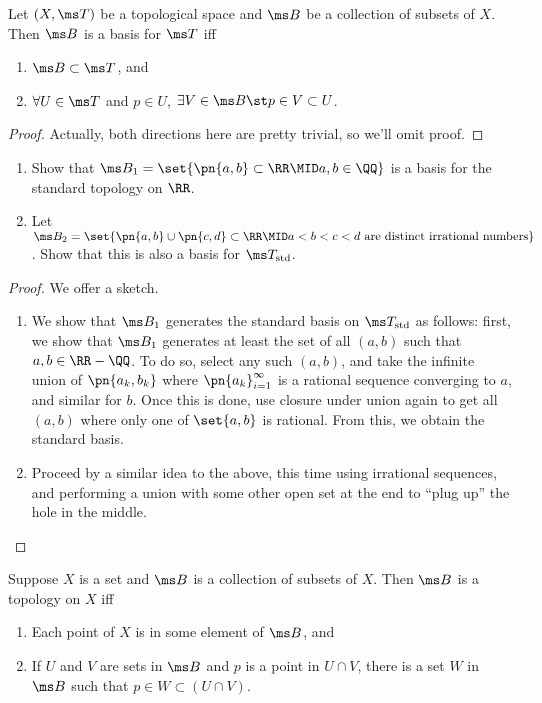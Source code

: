 \begin{problem}[4.1]
  Let $(X,\ms T)$ be a topological space and $\ms B$ be a collection of subsets
  of $X$. Then $\ms B$ is a basis for $\ms T$ iff
  \begin{enumerate}[label=\arabic*.]
    \item $\ms B \subset \ms T$, and
    \item $\forall U \in \ms T$ and $p \in U$, $\exists V \in \ms B \st p \in V
      \subset U$.
  \end{enumerate}
\end{problem}
\begin{proof}
  Actually, both directions here are pretty trivial, so we'll omit proof.
\end{proof}
\begin{problem}[4.2]
  \begin{enumerate}
    \item Show that $\ms B_1 = \set{\pn{a,b} \subset \RR \MID a,b \in \QQ}$ is a
      basis for the standard topology on $\RR$.
    \item Let $\ms B_2 = \set{\pn{a,b} \cup \pn{c,d} \subset \RR \MID a < b < c
        < d \text{ are distinct irrational numbers}}$. Show that this is also a
      basis for $\ms T_{\rm std}$.
  \end{enumerate}
\end{problem}
\begin{proof}
  We offer a sketch.
  \begin{enumerate}
    \item We show that $\ms B_1$ generates the standard basis on $\ms T_{\rm
        std}$ as follows: first, we show that $\ms B_1$ generates at least the
      set of all $(a,b)$ such that $a,b \in \RR - \QQ$. To do so, select any
      such $(a,b)$, and take the infinite union of $\pn{a_k, b_k}$ where
      $\pn{a_k}_{i=1}^\infty$ is a rational sequence converging to $a$, and
      similar for $b$. Once this is done, use closure under union again to get
      all $(a,b)$ where only one of $\set{a,b}$ is rational. From this, we
      obtain the standard basis.
    \item Proceed by a similar idea to the above, this time using irrational
      sequences, and performing a union with some other open set at the end to
      ``plug up'' the hole in the middle.
  \end{enumerate}
\end{proof}
\begin{problem}[4.3]
  Suppose $X$ is a set and $\ms B$ is a collection of subsets of $X$. Then $\ms
  B$ is a topology on $X$ iff
  \begin{enumerate}
    \item Each point of $X$ is in some element of $\ms B$, and
    \item If $U$ and $V$ are sets in $\ms B$ and $p$ is a point in $U \cap V$,
      there is a set $W$ in $\ms B$ such that $p \in W \subset (U \cap V)$.
  \end{enumerate}
\end{problem}
